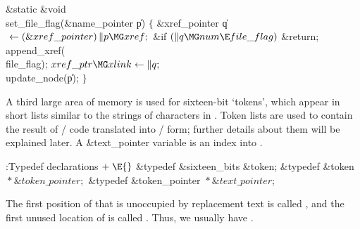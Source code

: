 \Y\B\1\1\&{static} \&{void} \\{set\_file\_flag}(\&{name\_pointer} \|p)\2\2\6
${}\{{}$\1\6
\&{xref\_pointer} \|q${}\K(\&{xref\_pointer})\,\|p\MG\\{xref};{}$\7
\&{if} ${}(\|q\MG\\{num}\E\\{file\_flag}){}$\1\5
\&{return};\2\6
\\{append\_xref}(\\{file\_flag});\6
${}\\{xref\_ptr}\MG\\{xlink}\K\|q;{}$\6
\\{update\_node}(\|p);\6
\4${}\}{}$\2\par
\fi

A third large area of memory is used for sixteen-bit `tokens', which
appear
in short lists similar to the strings of characters in .
Token lists
are used to contain the result of \CEE/ code translated into \TEX/ form;
further details about them will be explained later. A \&{text\_pointer}
variable is an index into .

\Y\B\4:Typedef declarations\X${}\mathrel+\E{}$\6
\&{typedef} \&{sixteen\_bits} \&{token};\6
\&{typedef} \&{token} ${}{*}\&{token\_pointer};{}$\6
\&{typedef} \&{token\_pointer} ${}{*}\&{text\_pointer}{}$;\par
\fi

The first position of 
that is unoccupied by replacement text is called , and the
first
unused location of  is called .
Thus, we usually have .

